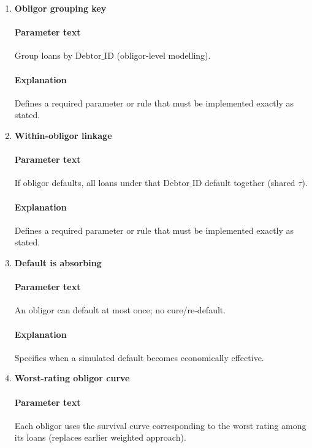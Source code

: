 \documentclass[11pt]{article}
\begin{document}
\begin{enumerate}[label=\arabic*),leftmargin=*,align=left]
\paragraph{Explanation} Defines a required parameter or rule that must be implemented exactly as stated.

\item \textbf{Obligor grouping key}
\paragraph{Parameter text} Group loans by $\text{Debtor\_ID}$ (obligor-level modelling).
\paragraph{Explanation} Defines a required parameter or rule that must be implemented exactly as stated.

\item \textbf{Within-obligor linkage}
\paragraph{Parameter text} If obligor defaults, all loans under that $\text{Debtor\_ID}$ default together (shared $\tau$).
\paragraph{Explanation} Defines a required parameter or rule that must be implemented exactly as stated.

\item \textbf{Default is absorbing}
\paragraph{Parameter text} An obligor can default at most once; no cure/re-default.
\paragraph{Explanation} Specifies when a simulated default becomes economically effective.

\item \textbf{Worst-rating obligor curve}
\paragraph{Parameter text} Each obligor uses the survival curve corresponding to the worst rating among its loans (replaces earlier weighted approach).

\end{enumerate}
\end{document}

